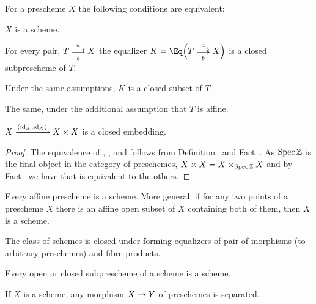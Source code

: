 \documentclass[a4paper,parskip=half,numbers=enddot, DIV=12]{scrreprt}
\begin{document}
\begin{fact}
    For a prescheme $X$ the following conditions are equivalent:
    \begin{alphanumerate}
    \item 
        $X$ is a scheme.
    \item 
        For every pair, $T\doublemorphism[a][b] X$ the equalizer $K = \Eq\Big(T\doublemorphism[a][b] X\Big)$ is a closed subprescheme of $T$.
    \item 
        Under the same assumptions, $K$ is a closed subset of $T$.
    \item 
        The same, under the additional assumption that $T$ is affine. 
    \item 
        $X\xrightarrow{(\operatorname{id}_X,\operatorname{id}_X)} X\times X$ is a closed embedding. 
    \end{alphanumerate}
\end{fact}
\begin{proof}
	The equivalence of , ,  and  follows from Definition~ and Fact~. As $\operatorname{Spec}\mathbb{Z}$ is the final object in the category of preschemes, $X\times X=X\times_{\operatorname{Spec}\mathbb{Z}}X$ and by Fact~ we have that  is equivalent to the others.
\end{proof}
\begin{fact}
    \begin{alphanumerate}
    \item {}
        Every affine prescheme is a scheme. More general, if for any two points of a prescheme $X$ there is an affine open subset of $X$ containing both of them, then $X$ is a scheme.
    \item 
        The class of schemes is closed under forming equalizers of pair of morphisms (to arbitrary preschemes) and fibre products.
    \item 
        Every open or closed subprescheme of a scheme is a scheme.
    \item 
        If $X$ is a scheme, any morphism $X\morphism Y$ of preschemes is separated.
    \end{alphanumerate}
\end{fact}
\end{document}
